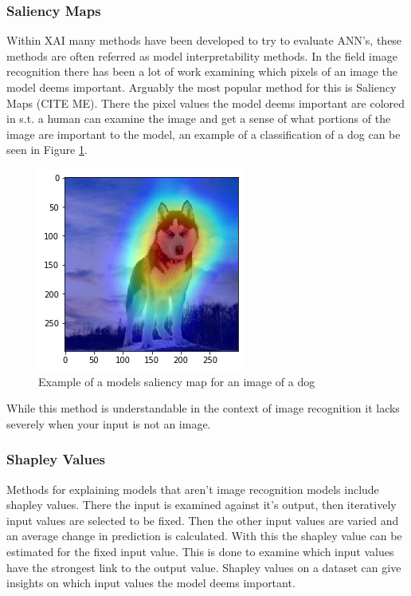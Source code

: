 \subsubsection{Saliency Maps}
Within XAI many methods have been developed to try to evaluate
ANN's, these methods are often referred as model interpretability methods.
In the field image recognition there has been a lot of work examining which
pixels of an image the model deems important. Arguably the most popular
method for this is Saliency Maps (CITE ME). There the pixel values the model
deems important are colored in s.t. a human can examine the image and get a
sense of what portions of the image are important to the model, an example of
a classification of a dog can be seen in Figure \ref{fig:dog_saliency}.

\begin{figure}[]
  \centering
  \includegraphics[width=.5\textwidth]{graphics/dog_saliency}
  \caption{Example of a models saliency map for an image of a dog}
  \label{fig:dog_saliency}
\end{figure}

While this method is understandable in the context of image recognition it
lacks severely when your input is not an image.

\subsubsection{Shapley Values}

Methods for explaining models that aren't image recognition models include
shapley values. There the input is examined against it's output, then iteratively
input values are selected to be fixed. Then the other input values are varied and
an average change in prediction is calculated. With this the shapley value can be
estimated for the fixed input value. This is done to examine which input values have
the strongest link to the output value. Shapley values on a dataset can give insights
on which input values the model deems important.

